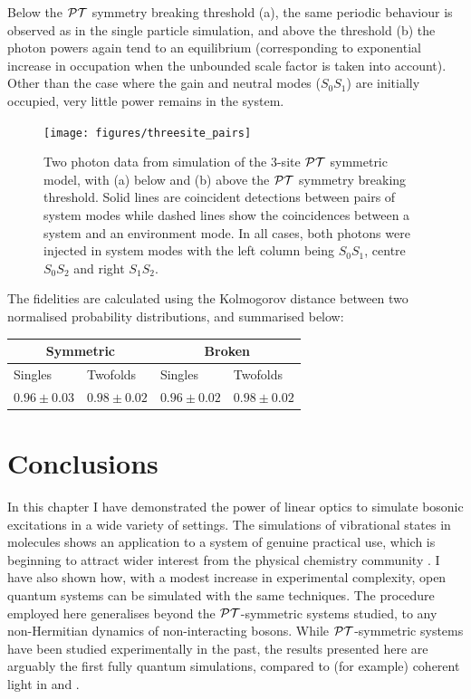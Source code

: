 Below the \(\mathcal{PT}\) symmetry breaking
threshold (a), the same periodic behaviour is observed as in the single particle
simulation, and above the threshold (b) the photon powers again tend to an
equilibrium (corresponding to exponential increase in occupation when the
unbounded scale factor is taken into account). Other than the case where the
gain and neutral modes (\(S_{0}S_{1}\)) are initially occupied, very little
power remains in the system.

\begin{figure}[p]
  \centering
  \texttt{[image: figures/threesite\_pairs]}
  \caption[Two photon data from simulation of the 3-site PT symmetric model]
  {Two photon data from simulation of the 3-site \(\mathcal{PT}\) symmetric model, with
  (a) below and (b) above the \(\mathcal{PT}\) symmetry breaking threshold. Solid lines
  are coincident detections between pairs of system modes while dashed lines
  show the coincidences between a system and an environment mode. In all cases,
  both photons were injected in system modes with the left column being
  \(S_{0}S_{1}\), centre \(S_{0}S_{2}\) and right \(S_{1}S_{2}\).}
  \label{fig:threesitetwofolds}
\end{figure}

The fidelities are calculated using the Kolmogorov distance between two
normalised probability distributions, and summarised below:

\begin{tabular}{|l|l|l|l|}
  \hline
  \multicolumn{2}{|c|}{Symmetric} & \multicolumn{2}{|c|}{Broken} \\
  \hline
  Singles & Twofolds & Singles & Twofolds \\
  \hline
  \(0.96 \pm 0.03\) & \(0.98 \pm 0.02\) & \(0.96 \pm 0.02\) &
  \(0.98 \pm 0.02\) \\
  \hline
\end{tabular}

\section{Conclusions}
In this chapter I have demonstrated the power of linear optics to simulate
bosonic
excitations in a wide variety of settings. The simulations of vibrational states
in molecules shows an application to a system of genuine practical use,
which is beginning to attract wider interest from the physical chemistry
community \cite{vibronics}. I have also shown how, with a modest increase in
experimental complexity, open quantum systems can be simulated with the same
techniques. The procedure employed here generalises beyond the \(\mathcal{PT}\)-symmetric
systems studied, to any non-Hermitian dynamics of non-interacting bosons. While
\(\mathcal{PT}\)-symmetric systems have been studied experimentally in the past, the
results presented here are arguably the first fully quantum simulations,
compared to (for example) coherent light in \cite{pt-ruter} and
\cite{pt-regensburger}.

